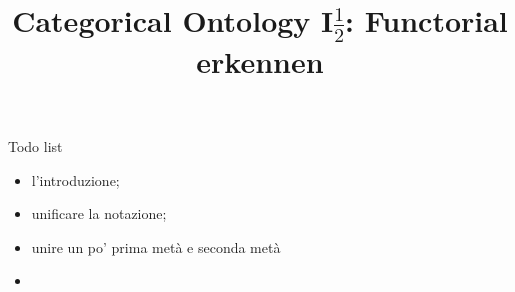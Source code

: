 \documentclass[a4paper]{../birkjour}
\title{Categorical Ontology I$\frac{1}{2}$: Functorial erkennen}
\newcommand{\fo}[1]{{\color{red} #1}}
\begin{document}

\maketitle

{\footnotesize\tableofcontents}
\newpage

\fo{Todo list
  \begin{itemize}
    \item l'introduzione;
    \item unificare la notazione;
    \item unire un po' prima metà e seconda metà
    \item 
  \end{itemize}
}








{}

\end{document}
